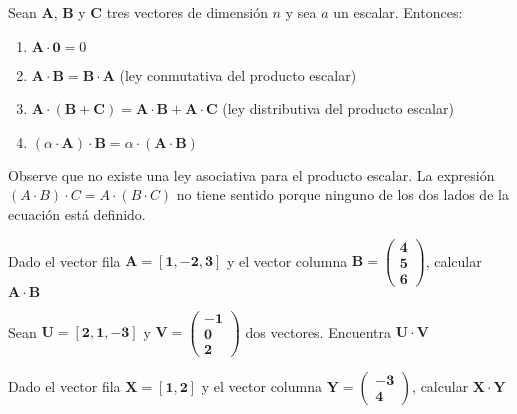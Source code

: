 \begin{tcolorbox}[colback=white!5!white,colframe=red!50!red,title=Teorema]
Sean $\mathbf{A}$, $\mathbf{B}$ y $\mathbf{C}$ tres vectores de dimensión \(n\) y sea \(a\) un escalar. Entonces:
\begin{enumerate}
    \item \( \mathbf{A} \cdot \mathbf{0} = 0 \)
    \item \( \mathbf{A} \cdot \mathbf{B} = \mathbf{B} \cdot \mathbf{A} \) (ley conmutativa del producto escalar)
    \item \( \mathbf{A} \cdot (\mathbf{B} + \mathbf{C}) = \mathbf{A} \cdot \mathbf{B} + \mathbf{A} \cdot \mathbf{C} \) (ley distributiva del producto escalar)
    \item \( (\alpha \cdot \mathbf{A}) \cdot \mathbf{B} = \alpha \cdot (\mathbf{A} \cdot \mathbf{B}) \)
\end{enumerate}
\end{tcolorbox}
\begin{remark}
Observe que no existe una ley asociativa para el producto escalar. La expresión $(A\cdot B) \cdot C =
A\cdot(B\cdot C) $ no tiene sentido porque ninguno de los dos lados de la ecuación está definido.   
\end{remark}
\begin{exercise}
 Dado el vector fila \( \mathbf{A} = [\mathbf{1}, \mathbf{-2}, \mathbf{3}] \) y el vector columna \( \mathbf{B} = \begin{pmatrix} \mathbf{4} \\ \mathbf{5} \\ \mathbf{6} \end{pmatrix} \), calcular \( \mathbf{A} \cdot \mathbf{B} \)  
\end{exercise}

\begin{exercise}
Sean \( \mathbf{U} = [\mathbf{2}, \mathbf{1}, \mathbf{-3}] \) y \( \mathbf{V} = \begin{pmatrix} \mathbf{-1} \\ \mathbf{0} \\ \mathbf{2} \end{pmatrix} \) dos vectores. Encuentra \( \mathbf{U} \cdot \mathbf{V} \) 
\end{exercise}
\begin{exercise}
Dado el vector fila \( \mathbf{X} = [\mathbf{1}, \mathbf{2}] \) y el vector columna \( \mathbf{Y} = \begin{pmatrix} \mathbf{-3} \\ \mathbf{4} \end{pmatrix} \), calcular \( \mathbf{X} \cdot \mathbf{Y} \)  
\end{exercise}
